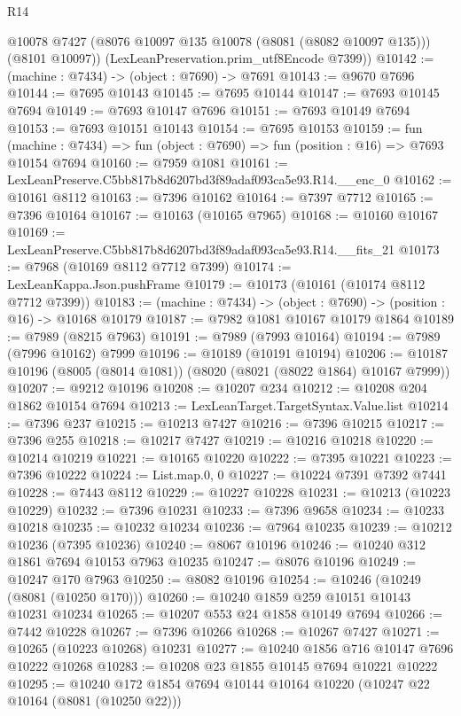 \begin{lexlean}{R14}
\begin{coremodule}
        @10078
        @7427
        (@8076 @10097 @135 @10078 (@8081 (@8082 @10097 @135)))
        (@8101 @10097))
      (LexLeanPreservation.prim_utf8Encode @7399))
@10142 := (machine : @7434) -> (object : @7690) -> @7691
@10143 := @9670 @7696
@10144 := @7695 @10143
@10145 := @7695 @10144
@10147 := @7693 @10145 @7694
@10149 := @7693 @10147 @7696
@10151 := @7693 @10149 @7694
@10153 := @7693 @10151 @10143
@10154 := @7695 @10153
@10159 := fun (machine : @7434) =>
  fun (object : @7690) => fun (position : @16) => @7693 @10154 @7694
@10160 := @7959 @1081
@10161 := LexLeanPreserve.C5bb817b8d6207bd3f89adaf093ca5e93.R14.__enc_0
@10162 := @10161 @8112
@10163 := @7396 @10162
@10164 := @7397 @7712
@10165 := @7396 @10164
@10167 := @10163 (@10165 @7965)
@10168 := @10160 @10167
@10169 := LexLeanPreserve.C5bb817b8d6207bd3f89adaf093ca5e93.R14.__fits_21
@10173 := @7968 (@10169 @8112 @7712 @7399)
@10174 := LexLeanKappa.Json.pushFrame
@10179 := @10173 (@10161 (@10174 @8112 @7712 @7399))
@10183 := (machine : @7434) -> (object : @7690) -> (position : @16) -> @10168 @10179
@10187 := @7982 @1081 @10167 @10179 @1864
@10189 := @7989 (@8215 @7963)
@10191 := @7989 (@7993 @10164)
@10194 := @7989 (@7996 @10162) @7999
@10196 := @10189 (@10191 @10194)
@10206 := @10187 @10196 (@8005 (@8014 @1081)) (@8020 (@8021 (@8022 @1864) @10167 @7999))
@10207 := @9212 @10196
@10208 := @10207 @234
@10212 := @10208 @204 @1862 @10154 @7694
@10213 := LexLeanTarget.TargetSyntax.Value.list
@10214 := @7396 @237
@10215 := @10213 @7427
@10216 := @7396 @10215
@10217 := @7396 @255
@10218 := @10217 @7427
@10219 := @10216 @10218
@10220 := @10214 @10219
@10221 := @10165 @10220
@10222 := @7395 @10221
@10223 := @7396 @10222
@10224 := List.map.{0, 0}
@10227 := @10224 @7391 @7392 @7441
@10228 := @7443 @8112
@10229 := @10227 @10228
@10231 := @10213 (@10223 @10229)
@10232 := @7396 @10231
@10233 := @7396 @9658
@10234 := @10233 @10218
@10235 := @10232 @10234
@10236 := @7964 @10235
@10239 := @10212 @10236 (@7395 @10236)
@10240 := @8067 @10196
@10246 := @10240 @312 @1861 @7694 @10153 @7963 @10235
@10247 := @8076 @10196
@10249 := @10247 @170 @7963
@10250 := @8082 @10196
@10254 := @10246 (@10249 (@8081 (@10250 @170)))
@10260 := @10240 @1859 @259 @10151 @10143 @10231 @10234
@10265 := @10207 @553 @24 @1858 @10149 @7694
@10266 := @7442 @10228
@10267 := @7396 @10266
@10268 := @10267 @7427
@10271 := @10265 (@10223 @10268) @10231
@10277 := @10240 @1856 @716 @10147 @7696 @10222 @10268
@10283 := @10208 @23 @1855 @10145 @7694 @10221 @10222
@10295 := @10240 @172 @1854 @7694 @10144 @10164 @10220 (@10247 @22 @10164 (@8081 (@10250 @22)))

\end{coremodule}
\end{lexlean}

